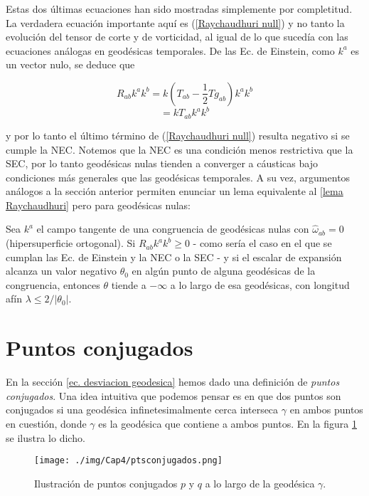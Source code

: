 Estas dos últimas ecuaciones han sido mostradas simplemente por completitud. La verdadera ecuación importante aquí es (\ref{Raychaudhuri null}) y no tanto la evolución del tensor de corte y de vorticidad, al igual de lo que sucedía con las ecuaciones análogas en geodésicas temporales. De las Ec. de Einstein, como $k^a$ es un vector nulo, se deduce que


$$
R_{ab}k^ak^b=k\left( T_{ab}-\frac{1}{2}Tg_{ab} \right)k^ak^b
$$
$$
=kT_{ab}k^ak^b
$$

y por lo tanto el último término de (\ref{Raychaudhuri null}) resulta negativo si se cumple la NEC. Notemos que la NEC es una condición menos restrictiva que la SEC, por lo tanto geodésicas nulas tienden a converger a cáusticas bajo condiciones más generales que las geodésicas temporales. A su vez, argumentos análogos a la sección anterior permiten enunciar un lema equivalente al \ref{lema Raychaudhuri} pero para geodésicas nulas:

\begin{lemma}
 Sea $k^a$ el campo tangente de una congruencia de geodésicas nulas con $\hat{\omega}_{ab}=0$ (hipersuperficie ortogonal). Si $R_{ab}k^ak^b\geq0$ - como sería el caso en el que se cumplan las Ec. de Einstein y la NEC o la SEC - y si el escalar de expansión alcanza un valor negativo $\theta_0$ en algún punto de alguna geodésicas de la congruencia, entonces $\theta$ tiende a $-\infty$ a lo largo de esa geodésicas, con longitud afín $\lambda\leq 2/|\theta_0|$.
\end{lemma}








    
\section{Puntos conjugados}\label{pts conjugados}



En la sección \ref{ec. desviacion geodesica} hemos dado una definición de \textit{puntos conjugados}. Una idea intuitiva que podemos pensar es en que dos puntos son conjugados si una geodésica infinetesimalmente cerca interseca $\gamma$ en ambos puntos en cuestión, donde $\gamma$ es la geodésica que contiene a ambos puntos. En la figura \ref{fig pts conjugados} se ilustra lo dicho.


\begin{figure}[h]
    \centering
    \texttt{[image: ./img/Cap4/ptsconjugados.png]}
    \caption{Ilustración de puntos conjugados $p$ y $q$ a lo largo de la geodésica $\gamma$.}
    \label{fig pts conjugados}
\end{figure}



